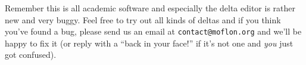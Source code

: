 Remember this is all academic software and especially the delta editor is rather new and very buggy.
Feel free to try out all kinds of deltas and if you think you've found a bug, please send us an email at \texttt{contact@moflon.org} and we'll be happy to fix it (or reply with a ``back in your face!'' if it's not one and \emph{you} just got confused).

